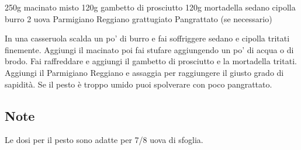 \begin{ingreds}
	250g macinato misto 
	120g gambetto di prosciutto 
	120g mortadella 
	sedano 
	cipolla 
	burro
	2 uova 
	Parmigiano Reggiano grattugiato 
	Pangrattato (se necessario)

\end{ingreds}

\begin{method}
In una casseruola scalda un po' di burro e fai soffriggere sedano e cipolla tritati finemente. Aggiungi il macinato poi fai stufare aggiungendo un po' di acqua o di brodo. Fai raffreddare e aggiungi il gambetto di prosciutto e la mortadella tritati. Aggiungi il Parmigiano Reggiano e assaggia per raggiungere il giusto grado di sapidità. Se il pesto è troppo umido puoi spolverare con poco pangrattato.


\end{method}

\subsection*{Note}
Le dosi per il pesto sono adatte per 7/8 uova di sfoglia.



